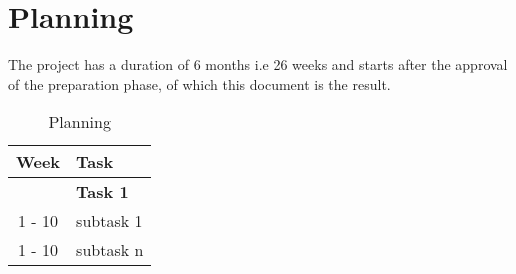 \section{Planning}
\label{sec:planning}
The project has a duration of 6 months i.e 26 weeks and starts after the approval of the preparation phase, of which this document is the result.

\begin{table}[htb]
	\centering
	\begin{tabular}{cl}
		\hline
		\textbf{Week} 	& \textbf{Task} \\
		\hline
						& \textbf{Task 1} \\
		1 - 10			& subtask 1 \\
		1 - 10			& subtask n \\
		\hline
	\end{tabular}
	\caption{Planning}
	\label{tab:planning}
\end{table}